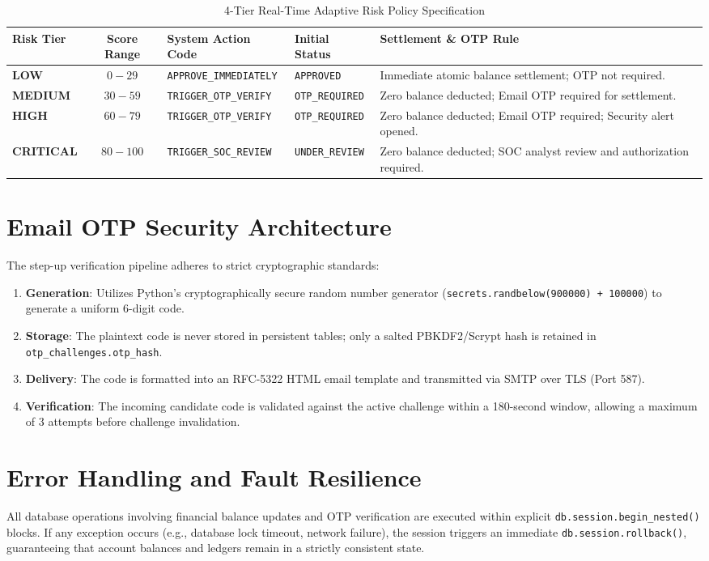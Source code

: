 \begin{table}[h]
\centering
\caption{4-Tier Real-Time Adaptive Risk Policy Specification}
\label{tab:risk_policy_table}
\begin{tabularx}{\textwidth}{lcp{3.2cm}p{2.5cm}X}
\toprule
\textbf{Risk Tier} & \textbf{Score Range} & \textbf{System Action Code} & \textbf{Initial Status} & \textbf{Settlement \& OTP Rule} \\
\midrule
\textbf{LOW} & $0 - 29$ & \texttt{APPROVE\_IMMEDIATELY} & \texttt{APPROVED} & Immediate atomic balance settlement; OTP not required. \\
\addlinespace
\textbf{MEDIUM} & $30 - 59$ & \texttt{TRIGGER\_OTP\_VERIFY} & \texttt{OTP\_REQUIRED} & Zero balance deducted; Email OTP required for settlement. \\
\addlinespace
\textbf{HIGH} & $60 - 79$ & \texttt{TRIGGER\_OTP\_VERIFY} & \texttt{OTP\_REQUIRED} & Zero balance deducted; Email OTP required; Security alert opened. \\
\addlinespace
\textbf{CRITICAL} & $80 - 100$ & \texttt{TRIGGER\_SOC\_REVIEW} & \texttt{UNDER\_REVIEW} & Zero balance deducted; SOC analyst review and authorization required. \\
\bottomrule
\end{tabularx}
\end{table}

\section{Email OTP Security Architecture}
The step-up verification pipeline adheres to strict cryptographic standards:
\begin{enumerate}[label=\alph*.]
    \item \textbf{Generation}: Utilizes Python's cryptographically secure random number generator (\texttt{secrets.randbelow(900000) + 100000}) to generate a uniform 6-digit code.
    \item \textbf{Storage}: The plaintext code is never stored in persistent tables; only a salted PBKDF2/Scrypt hash is retained in \texttt{otp\_challenges.otp\_hash}.
    \item \textbf{Delivery}: The code is formatted into an RFC-5322 HTML email template and transmitted via SMTP over TLS (Port 587).
    \item \textbf{Verification}: The incoming candidate code is validated against the active challenge within a 180-second window, allowing a maximum of 3 attempts before challenge invalidation.
\end{enumerate}

\section{Error Handling and Fault Resilience}
All database operations involving financial balance updates and OTP verification are executed within explicit \texttt{db.session.begin\_nested()} blocks. If any exception occurs (e.g., database lock timeout, network failure), the session triggers an immediate \texttt{db.session.rollback()}, guaranteeing that account balances and ledgers remain in a strictly consistent state.
